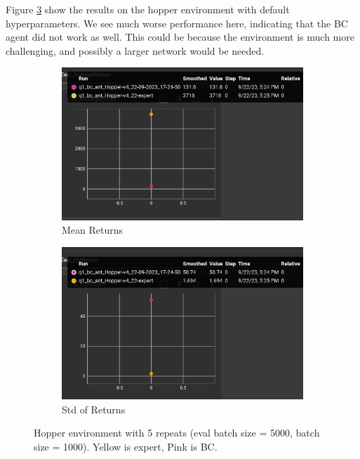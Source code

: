 \documentclass[11pt]{article}
\begin{document}
Figure \ref{fig:hop} show the results on the hopper environment with default hyperparameters.
We see much worse performance here, indicating that the BC agent did not work as well.
This could be because the environment is much more challenging, and possibly a larger network would be needed.
\begin{figure}[h]
    \centering
    \begin{subfigure}[b]{0.47\textwidth}
        \centering
        \includegraphics[width=\textwidth]{09-22-hop_mean}
        \caption{Mean Returns}
        \label{fig:hop_mean}
    \end{subfigure}
    \hfill
    \begin{subfigure}[b]{0.47\textwidth}
        \centering
        \includegraphics[width=\textwidth]{09-22-hop_std}
        \caption{Std of Returns}
        \label{fig:hop_std}
    \end{subfigure}
    \caption{Hopper environment with 5 repeats (eval batch size = 5000, batch size = 1000). Yellow is expert, Pink is BC.}
    \label{fig:hop}
\end{figure}
\end{document}
